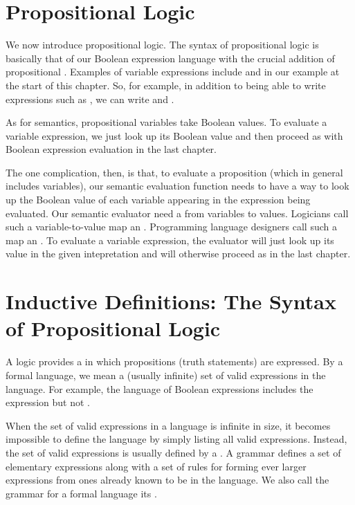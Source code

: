 \documentclass[letterpaper,10pt,english]{sphinxmanual}
\begin{document}
\section{Propositional Logic}
\label{\detokenize{09-propositional-logic:id1}}
We now introduce propositional logic. The syntax of propositional
logic is basically that of our Boolean expression language with the
crucial addition of propositional . Examples of
variable expressions include  and  in our example at the start
of this chapter. So, for example, in addition to being able to write
expressions such as , we can write 
and .

As for semantics, propositional variables take Boolean values. To
evaluate a variable expression, we just look up its Boolean value
and then proceed as with Boolean expression evaluation in the last
chapter.

The one complication, then, is that, to evaluate a proposition (which
in general includes variables), our semantic evaluation function needs
to have a way to look up the Boolean value of each variable appearing
in the expression being evaluated. Our semantic evaluator need a 
from variables to values.  Logicians call such a variable-to-value map
an . Programming language designers call such a map an
. To evaluate a variable expression, the evaluator will
just look up its value in the given intepretation and will otherwise
proceed as in the last chapter.


\section{Inductive Definitions: The Syntax of Propositional Logic}
\label{\detokenize{09-propositional-logic:inductive-definitions-the-syntax-of-propositional-logic}}
A logic provides a  in which propositions (truth
statements) are expressed. By a formal language, we mean a (usually
infinite) set of valid expressions in the language. For example, the
language of Boolean expressions includes the expression  but not .

When the set of valid expressions in a language is infinite in size,
it becomes impossible to define the language by simply listing all
valid expressions. Instead, the set of valid expressions is usually
defined  by a . A grammar defines a set of
elementary expressions along with a set of rules for forming ever
larger expressions from ones already known to be in the language. We
also call the grammar for a formal language its .
\end{document}
